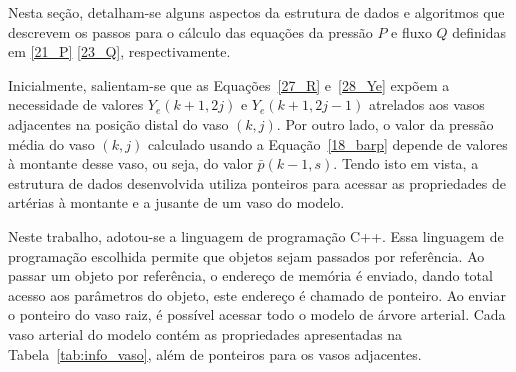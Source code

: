 Nesta seção, detalham-se alguns aspectos da estrutura de dados e algoritmos que descrevem os passos para o cálculo das equações da pressão $P$ e fluxo $Q$ definidas em \eqref{21_P} \eqref{23_Q}, respectivamente.

Inicialmente, salientam-se que as Equações~\eqref{27_R} e~\eqref{28_Ye} expõem a necessidade de valores $Y_e(k+1,2j)$ e $Y_e(k+1,2j-1)$ atrelados aos vasos adjacentes na posição distal do vaso $(k,j)$. Por outro lado, o valor da pressão média do vaso $(k,j)$ calculado usando a Equação~\eqref{18_barp} depende de valores  à montante desse vaso, ou seja, do valor $\bar{p}(k-1,s)$. Tendo isto em vista, a estrutura de dados desenvolvida utiliza ponteiros para acessar as propriedades de artérias à montante e a jusante de um vaso do modelo.

Neste trabalho, adotou-se a linguagem de programação C++. Essa linguagem de programação escolhida permite que objetos sejam passados por referência. Ao passar um objeto por referência, o endereço de memória é enviado, dando total acesso aos parâmetros do objeto, este endereço é chamado de ponteiro. Ao enviar o ponteiro do vaso raiz, é possível acessar todo o modelo de árvore arterial. Cada vaso arterial do modelo contém as propriedades apresentadas na Tabela~\ref{tab:info_vaso}, além de ponteiros para os vasos adjacentes. 

